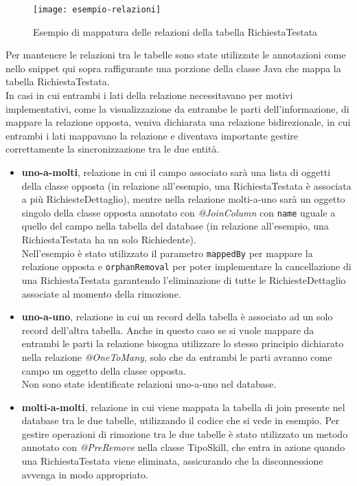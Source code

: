 \begin{figure}[H] 
    \centering 
    \texttt{[image: esempio-relazioni]} 
    \caption{Esempio di mappatura delle relazioni della tabella RichiestaTestata}
\end{figure}
\noindent Per mantenere le relazioni tra le tabelle sono state utilizzate le annotazioni come nello snippet qui sopra raffigurante una porzione della classe Java che mappa la tabella RichiestaTestata.\\
In casi in cui entrambi i lati della relazione necessitavano per motivi implementativi, come la visualizzazione da entrambe le parti dell'informazione, di mappare la relazione opposta, veniva dichiarata una relazione bidirezionale, in cui entrambi i lati mappavano la relazione e diventava importante gestire correttamente la sincronizzazione tra le due entità.
\begin{itemize}
\item \textbf{uno-a-molti}, relazione in cui il campo associato sarà una lista di oggetti della classe opposta (in relazione all'esempio, una RichiestaTestata è associata a più RichiesteDettaglio), mentre nella relazione molti-a-uno sarà un oggetto singolo della classe opposta annotato con \textit{@JoinColumn} con \texttt{name} uguale a quello del campo nella tabella del database (in relazione all'esempio, una RichiestaTestata ha un solo Richiedente).\\
Nell'esempio è stato utilizzato il parametro \texttt{mappedBy} per mappare la relazione opposta e \texttt{orphanRemoval} per poter implementare la cancellazione di una RichiestaTestata garantendo l'eliminazione di tutte le RichiesteDettaglio associate al momento della rimozione.
\item \textbf{uno-a-uno}, relazione in cui un record della tabella è associato ad un solo record dell'altra tabella. Anche in questo caso se si vuole mappare da entrambi le parti la relazione bisogna utilizzare lo stesso principio dichiarato nella relazione \textit{@OneToMany}, solo che da entrambi le parti avranno come campo un oggetto della classe opposta.\\
Non sono state identificate relazioni uno-a-uno nel database.
\item \textbf{molti-a-molti}, relazione in cui viene mappata la tabella di join presente nel database tra le due tabelle, utilizzando il codice che si vede in esempio.
Per gestire operazioni di rimozione tra le due tabelle è stato utilizzato un metodo annotato con \textit{@PreRemove} nella classe TipoSkill, che entra in azione quando una RichiestaTestata viene eliminata, assicurando che la disconnessione avvenga in modo appropriato.
\end{itemize}